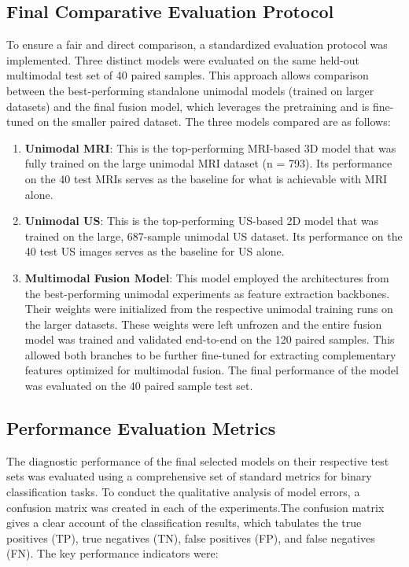 \documentclass[12pt]{article}
\begin{document}
\subsection{Final Comparative Evaluation Protocol}

To ensure a fair and direct comparison, a standardized evaluation protocol was implemented. Three distinct models were evaluated on the same held-out multimodal test set of 40 paired samples. This approach allows comparison between the best-performing standalone unimodal models (trained on larger datasets) and the final fusion model, which leverages the pretraining and is fine-tuned on the smaller paired dataset. The three models compared are as follows:

\begin{enumerate}
    \item \textbf{Unimodal MRI}: This is the top-performing MRI-based 3D model that was fully trained on the large unimodal MRI dataset (n = 793). Its performance on the 40 test MRIs serves as the baseline for what is achievable with MRI alone.
    \item \textbf{Unimodal US}: This is the top-performing US-based 2D model that was trained on the large,  687-sample unimodal US dataset. Its performance on the 40 test US images serves as the baseline for US alone.
    \item \textbf{Multimodal Fusion Model}: This model employed the architectures from the best-performing unimodal experiments as feature extraction backbones. Their weights were initialized from the respective unimodal training runs on the larger datasets. These weights were left unfrozen and the entire fusion model was trained and validated end-to-end on the 120 paired samples. This allowed both branches to be further fine-tuned for extracting complementary features optimized for multimodal fusion. The final performance of the model was evaluated on the 40 paired sample test set.
\end{enumerate}

\subsection{Performance Evaluation Metrics}

The diagnostic performance of the final selected models on their respective test sets was evaluated using a comprehensive set of standard metrics for binary classification tasks. To conduct the qualitative analysis of model errors, a confusion matrix was created in each of the experiments.The confusion matrix gives a clear account of the classification results, which tabulates the true positives (TP), true negatives (TN), false positives (FP), and false negatives (FN). The key performance indicators were:
\end{document}
